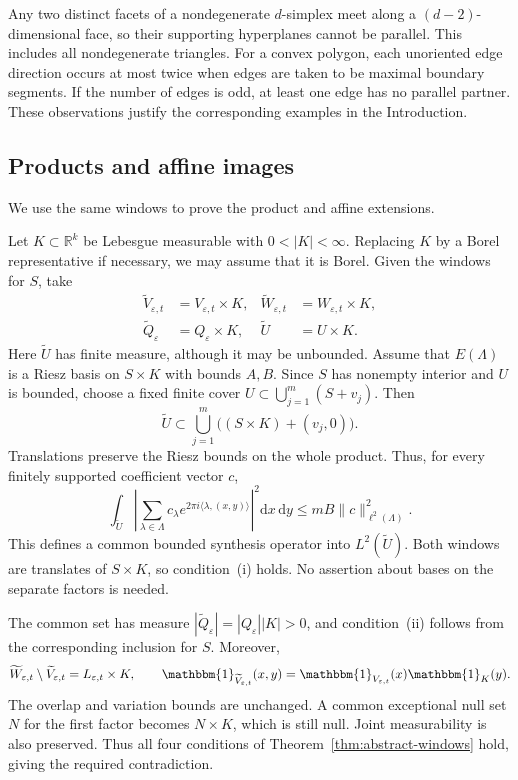 \documentclass[12pt,reqno,tbtags]{amsart}
\def\R{\mathbb{R}}
\def\d{\mathrm{d}}
\newcommand\norm[1]{\|#1\|}
\newcommand\inpro[2]{\langle #1,#2\rangle}
\newcommand\1{\mathbbm{1}}
\newcommand{\eps}{\varepsilon}
\def\d{\mathrm{d}}
\begin{document}
Any two distinct facets of a nondegenerate $d$-simplex meet along a
$(d-2)$-dimensional face, so their supporting hyperplanes cannot be parallel.
This includes all nondegenerate triangles.
For a convex polygon, each unoriented edge direction occurs at most twice
when edges are taken to be maximal boundary segments. If the number of edges
is odd, at least one edge has no parallel partner.
These observations justify the corresponding examples in the Introduction.

\subsection{Products and affine images}

We use the same windows to prove the product and affine extensions.

Let $K\subset\R^k$ be Lebesgue measurable with $0<|K|<\infty$.
Replacing $K$ by a Borel representative if necessary, we may assume that it
is Borel. Given the windows for $S$, take
\begin{equation*}
    \begin{aligned}
    \widetilde V_{\eps,t}&=V_{\eps,t}\times K,&
    \widetilde W_{\eps,t}&=W_{\eps,t}\times K,\\
    \widetilde Q_\eps&=Q_\eps\times K,&
    \widetilde U&=U\times K.
    \end{aligned}
\end{equation*}
Here $\widetilde U$ has finite measure, although it may be unbounded.
Assume that $E(\Lambda)$ is a Riesz basis on $S\times K$ with bounds $A,B$.
Since $S$ has nonempty interior and $U$ is bounded, choose a fixed finite cover
$U\subset\bigcup_{j=1}^{m}(S+v_j)$. Then
\begin{equation*}
    \widetilde U\subset\bigcup_{j=1}^{m}
    \bigl((S\times K)+(v_j,0)\bigr).
\end{equation*}
Translations preserve the Riesz bounds on the whole product. Thus,
for every finitely supported coefficient vector $c$,
\begin{equation*}
    \int_{\widetilde U}
    \left|\sum_{\lambda\in\Lambda}c_\lambda
    e^{2\pi i\inpro{\lambda}{(x,y)}}\right|^2\d x\,\d y
    \le mB\norm{c}_{\ell^2(\Lambda)}^2.
\end{equation*}
This defines a common bounded synthesis operator into $L^2(\widetilde U)$.
Both windows are translates of $S\times K$, so condition~(i) holds.
No assertion about bases on the separate factors is needed.

The common set has measure $|\widetilde Q_\eps|=|Q_\eps||K|>0$,
and condition~(ii) follows from the corresponding inclusion for $S$.
Moreover,
\begin{equation*}
    \widetilde W_{\eps,t}\setminus\widetilde V_{\eps,t}
    =L_{\eps,t}\times K,\qquad
    \1_{\widetilde V_{\eps,t}}(x,y)
    =\1_{V_{\eps,t}}(x)\1_K(y).
\end{equation*}
The overlap and variation bounds are unchanged. A common exceptional null
set $N$ for the first factor becomes $N\times K$, which is still null.
Joint measurability is also preserved. Thus all four conditions of
Theorem~\ref{thm:abstract-windows} hold, giving the required contradiction.
\end{document}

